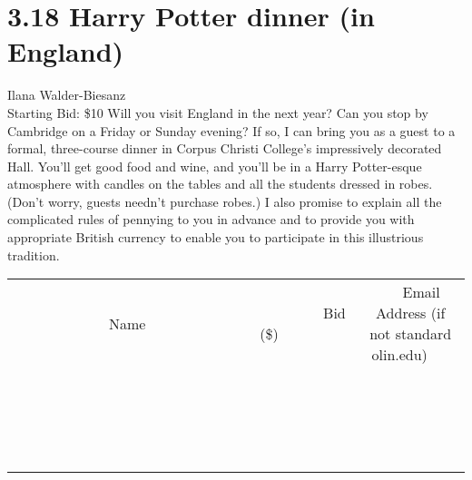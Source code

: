 \documentclass[11pt]{article}
\begin{document}
\section*{3.18 Harry Potter dinner (in England)}
Ilana Walder-Biesanz
\\
Starting Bid: \$10
\newline
Will you visit England in the next year? Can you stop by Cambridge on a Friday or Sunday evening? If so, I can bring you as a guest to a formal, three-course dinner in Corpus Christi College's impressively decorated Hall. You'll get good food and wine, and you'll be in a Harry Potter-esque atmosphere with candles on the tables and all the students dressed in robes. (Don't worry, guests needn't purchase robes.) I also promise to explain all the complicated rules of pennying to you in advance and to provide you with appropriate British currency to enable you to participate in this illustrious tradition.
\\[3ex]
\begin{tabular}{c c c}
~~~~~~~~~~~~~Name~~~~~~~~~~~~~ & ~~~~~~~~~Bid (\$)~~~~~~~~~  & ~~~Email Address (if not standard olin.edu)~~~\\
 & & \\
\hline
 & & \\
\hline
 & & \\
\hline
 & & \\
\hline
 & & \\
\hline
 & & \\
\hline
 & & \\
\hline
 & & \\
\hline
 & & \\
\hline
 & & \\
\hline
 & & \\
\hline
 & & \\
\hline
 & & \\
\hline
 & & \\
\hline
 & & \\
\hline
 & & \\
\hline
 & & \\
\hline
 & & \\
\hline
 & & \\
\hline
\end{tabular}
\newpage
\end{document}
